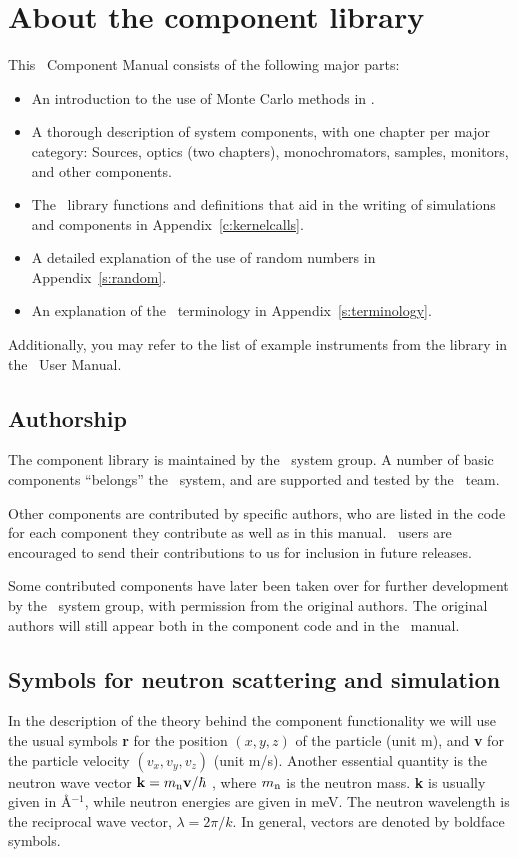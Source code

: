
\chapter{About the component library}
\label{c:components}
This \MCS\ Component Manual consists of the following major parts:
\begin{itemize}
\item An introduction to the use of Monte Carlo methods in \MCS .
\item A thorough description of system components,
with one chapter per major category: Sources, optics (two chapters),
monochromators, samples, monitors, and other components.
\item The \MCS\ library functions and definitions
  that aid in the writing of simulations and components in
  Appendix~\ref{c:kernelcalls}.
\item A detailed explanation of the use of random numbers 
   in Appendix~\ref{s:random}.
\item An explanation of the \MCS\ terminology in Appendix~\ref{s:terminology}.
\end{itemize}
Additionally, you may refer to the list of example instruments
from the library in the \MCS\ User Manual.

\section{Authorship}
The component library is
maintained by the \MCS\ system group. A number of basic components
``belongs'' the \MCS\ system, and are supported and tested by the \MCS\
team.

Other components are contributed
by specific authors, who are listed in the code for each component
they contribute as well as in this manual.
\MCS\ users are encouraged to send their
contributions to us for inclusion in future releases.

Some contributed components have later been taken over 
for further development by the \MCS\ system
group, with permission from the original authors.
The original authors will still appear both in the component code and in the
\MCS\ manual.

\section{Symbols for neutron scattering and simulation}
In the description of the theory behind the component functionality
we will use the usual symbols {\bf r} for the position
$(x,y,z)$ of the particle (unit m), and {\bf v} for
the particle velocity $(v_x, v_y, v_z)$ (unit m/s).
Another essential quantity is the neutron wave vector
${\bf k} = m_{\rm n} {\bf v}/\hbar$ , where
$m_{\rm n}$ is the neutron mass. {\bf k} is usually given in
\AA$^{-1}$, while neutron energies are given in meV.
The neutron wavelength is the reciprocal wave vector,
$\lambda=2 \pi / k$.
In general, vectors are denoted by boldface symbols.

